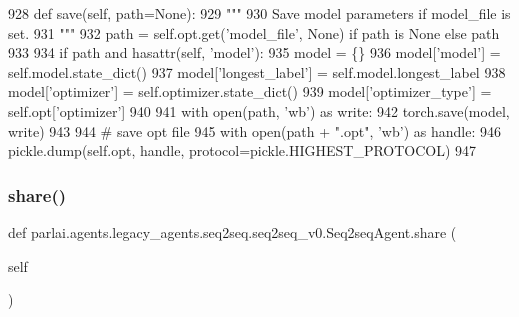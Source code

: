 \begin{DoxyCode}
928     \textcolor{keyword}{def }save(self, path=None):
929         \textcolor{stringliteral}{"""}
930 \textcolor{stringliteral}{        Save model parameters if model\_file is set.}
931 \textcolor{stringliteral}{        """}
932         path = self.opt.get(\textcolor{stringliteral}{'model\_file'}, \textcolor{keywordtype}{None}) \textcolor{keywordflow}{if} path \textcolor{keywordflow}{is} \textcolor{keywordtype}{None} \textcolor{keywordflow}{else} path
933 
934         \textcolor{keywordflow}{if} path \textcolor{keywordflow}{and} hasattr(self, \textcolor{stringliteral}{'model'}):
935             model = \{\}
936             model[\textcolor{stringliteral}{'model'}] = self.model.state\_dict()
937             model[\textcolor{stringliteral}{'longest\_label'}] = self.model.longest\_label
938             model[\textcolor{stringliteral}{'optimizer'}] = self.optimizer.state\_dict()
939             model[\textcolor{stringliteral}{'optimizer\_type'}] = self.opt[\textcolor{stringliteral}{'optimizer'}]
940 
941             with open(path, \textcolor{stringliteral}{'wb'}) \textcolor{keyword}{as} write:
942                 torch.save(model, write)
943 
944             \textcolor{comment}{# save opt file}
945             with open(path + \textcolor{stringliteral}{".opt"}, \textcolor{stringliteral}{'wb'}) \textcolor{keyword}{as} handle:
946                 pickle.dump(self.opt, handle, protocol=pickle.HIGHEST\_PROTOCOL)
947 
\end{DoxyCode}
\mbox{\label{classparlai_1_1agents_1_1legacy__agents_1_1seq2seq_1_1seq2seq__v0_1_1Seq2seqAgent_ac050147b69c47182730e92866f64156a}} 
\subsubsection{\texorpdfstring{share()}{share()}}
{\footnotesize\ttfamily def parlai.\+agents.\+legacy\+\_\+agents.\+seq2seq.\+seq2seq\+\_\+v0.\+Seq2seq\+Agent.\+share (\begin{DoxyParamCaption}\item[{}]{self }\end{DoxyParamCaption})}

